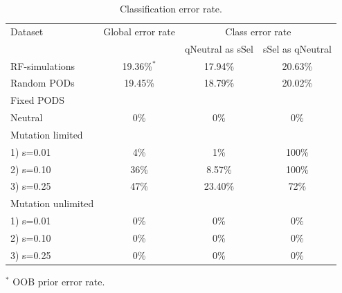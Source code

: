 \documentclass[a4paper, 12pt]{article}
\begin{document}
\begin{table}[ht]
\centering
  \begin{threeparttable}
   \caption{Classification error rate.}
   \label{table:table3}
     \begin{tabular}{lccc}
     \toprule
      Dataset               & Global error rate  & \multicolumn{2}{c}{Class error rate} \\
        {}                  & {}                 & qNeutral as sSel & sSel as qNeutral  \\
     \midrule
      RF-simulations        & 19.36\%$^*$        & 17.94\%          & 20.63\%           \\
      Random PODs           & 19.45\%            & 18.79\%          & 20.02\%           \\
      Fixed PODS            &                    &                  &                   \\
      Neutral               & 0\%                & 0\%              & 0\%               \\
      Mutation limited      &                    &                  &                   \\
         1) s=0.01          & 4\%                & 1\%              & 100\%             \\
         2) s=0.10          & 36\%               & 8.57\%           & 100\%             \\
         3) s=0.25          & 47\%               & 23.40\%          & 72\%              \\
      Mutation unlimited    &                    &                  &                   \\
         1) s=0.01          & 0\%                & 0\%              & 0\%               \\
         2) s=0.10          & 0\%                & 0\%              & 0\%               \\
         3) s=0.25          & 0\%                & 0\%              & 0\%               \\
     \bottomrule
     \end{tabular}
     \begin{tablenotes}
      \small
      \item $^*$ OOB prior error rate.
     \end{tablenotes}
  \end{threeparttable}
  \label{tab:tab3}
\end{table}
\end{document}
